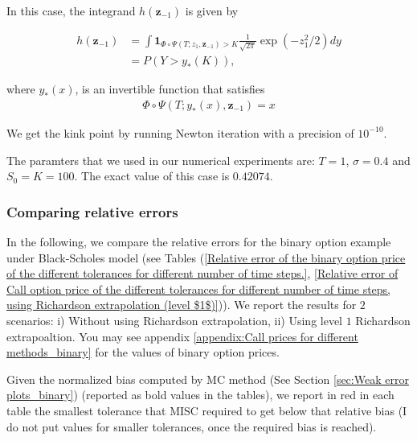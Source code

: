 \documentclass[11pt]{article}
\begin{document}
In this case, the integrand $h(\mathbf{z}_{-1})$ is given by

\begin{align}\label{smoothed_integrand_binary_opt_2}
	h(\mathbf{z}_{-1})&= \int \mathbf{1}_{\Phi \circ \Psi(T;z_1,\mathbf{z}_{-1})>K}\frac{1}{\sqrt{2 \pi}} \operatorname{exp} (-z_1^2/2) dy \nonumber\\
	&=  P(Y>y_{\ast}(K)) ,
\end{align}
 
where  $y_{\ast}(x)$, is an invertible function that satisfies 
\begin{align}
	\Phi \circ \Psi (T;y_{\ast}(x),\mathbf{z}_{-1})=x	
\end{align}

We get the kink point by running Newton iteration with a precision of $10^{-10}$.

The paramters that we used in our numerical experiments are: $T=1$, $\sigma=0.4$ and $S_0=K=100$. The exact value of this case is $0.42074$.

\subsubsection{Comparing relative errors}

In the following, we compare the  relative errors for the binary option example under Black-Scholes model (see Tables (\ref{Relative error of the binary option price of the different tolerances for different number of time steps.}, \ref{Relative error of Call option price of the different tolerances for different number of time steps, using Richardson extrapolation (level $1$)})). We report the results for $2$ scenarios: i) Without using Richardson extrapolation, ii) Using level $1$ Richardson extrapoaltion.  You may see appendix \ref{appendix:Call prices for different methods_binary} for the values of binary option prices.

Given the normalized bias computed by MC method (See Section \ref{sec:Weak error plots_binary}) (reported as bold values in the tables), we report in red in each table the smallest tolerance that MISC required to get below that relative bias (I do not put values for smaller tolerances, once the required bias is reached).
\end{document}
